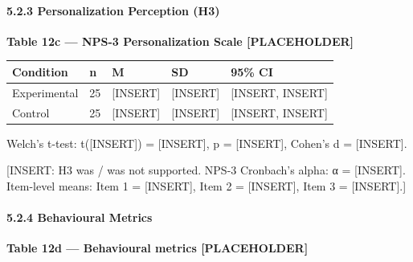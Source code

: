 \paragraph{5.2.3 Personalization Perception
(H3)}\label{personalization-perception-h3}

\textbf{Table 12c --- NPS-3 Personalization Scale {[}PLACEHOLDER{]}}

\begin{longtable}[]{@{}lllll@{}}
\toprule\noalign{}
Condition & n & M & SD & 95\% CI \\
\midrule\noalign{}
\endhead
\bottomrule\noalign{}
\endlastfoot
Experimental & 25 & {[}INSERT{]} & {[}INSERT{]} & {[}INSERT,
INSERT{]} \\
Control & 25 & {[}INSERT{]} & {[}INSERT{]} & {[}INSERT, INSERT{]} \\
\end{longtable}

Welch's t-test: t({[}INSERT{]}) = {[}INSERT{]}, p = {[}INSERT{]},
Cohen's d = {[}INSERT{]}.

{[}INSERT: H3 was / was not supported. NPS-3 Cronbach's alpha: α =
{[}INSERT{]}. Item-level means: Item 1 = {[}INSERT{]}, Item 2 =
{[}INSERT{]}, Item 3 = {[}INSERT{]}.{]}

\paragraph{5.2.4 Behavioural Metrics}\label{behavioural-metrics}

\textbf{Table 12d --- Behavioural metrics {[}PLACEHOLDER{]}}

